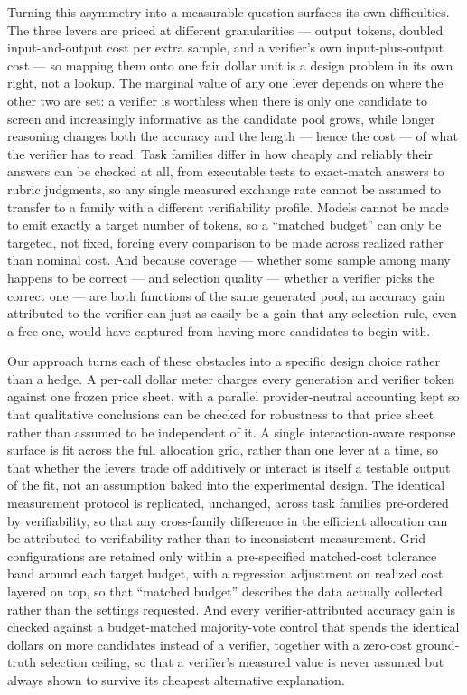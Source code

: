 \documentclass[11pt]{article}
\begin{document}
Turning this asymmetry into a measurable question surfaces its own difficulties. The three levers are priced at different granularities --- output tokens, doubled input-and-output cost per extra sample, and a verifier's own input-plus-output cost --- so mapping them onto one fair dollar unit is a design problem in its own right, not a lookup. The marginal value of any one lever depends on where the other two are set: a verifier is worthless when there is only one candidate to screen and increasingly informative as the candidate pool grows, while longer reasoning changes both the accuracy and the length --- hence the cost --- of what the verifier has to read. Task families differ in how cheaply and reliably their answers can be checked at all, from executable tests to exact-match answers to rubric judgments, so any single measured exchange rate cannot be assumed to transfer to a family with a different verifiability profile. Models cannot be made to emit exactly a target number of tokens, so a ``matched budget'' can only be targeted, not fixed, forcing every comparison to be made across realized rather than nominal cost. And because coverage --- whether some sample among many happens to be correct --- and selection quality --- whether a verifier picks the correct one --- are both functions of the same generated pool, an accuracy gain attributed to the verifier can just as easily be a gain that any selection rule, even a free one, would have captured from having more candidates to begin with.

Our approach turns each of these obstacles into a specific design choice rather than a hedge. A per-call dollar meter charges every generation and verifier token against one frozen price sheet, with a parallel provider-neutral accounting kept so that qualitative conclusions can be checked for robustness to that price sheet rather than assumed to be independent of it. A single interaction-aware response surface is fit across the full allocation grid, rather than one lever at a time, so that whether the levers trade off additively or interact is itself a testable output of the fit, not an assumption baked into the experimental design. The identical measurement protocol is replicated, unchanged, across task families pre-ordered by verifiability, so that any cross-family difference in the efficient allocation can be attributed to verifiability rather than to inconsistent measurement. Grid configurations are retained only within a pre-specified matched-cost tolerance band around each target budget, with a regression adjustment on realized cost layered on top, so that ``matched budget'' describes the data actually collected rather than the settings requested. And every verifier-attributed accuracy gain is checked against a budget-matched majority-vote control that spends the identical dollars on more candidates instead of a verifier, together with a zero-cost ground-truth selection ceiling, so that a verifier's measured value is never assumed but always shown to survive its cheapest alternative explanation.
\end{document}
